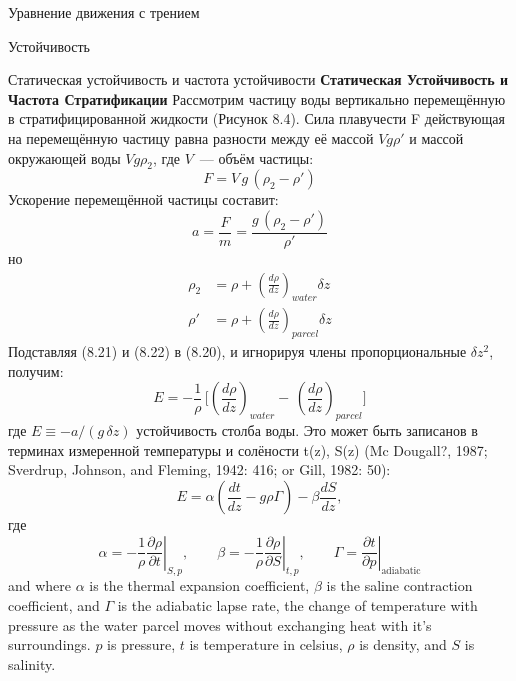 \begin{chapter}{Уравнение движения с трением}
\begin{section}{Устойчивость}
\begin{paragraph}{Статическая устойчивость и частота устойчивости}
\textbf{Статическая Устойчивость и Частота Стратификации}
Рассмотрим частицу воды вертикально перемещённую в стратифицированной
жидкости (Рисунок 8.4). Сила плавучести F действующая на перемещённую
частицу равна разности между её массой $V g \rho '$ и массой окружающей воды
$V g \rho_2$, где $V$~--- объём частицы:
\begin{displaymath}
F=V\,g\,(\rho_2-\rho{'})
\end{displaymath}
Ускорение перемещённой частицы составит:
\begin{equation}
a=\frac{F}{m}=\frac{g\,(\rho_2-\rho{'})}{\rho{'}}
\end{equation}
но
\begin{align}
\rho_2  &= \rho + \left( \frac{d {\rho}}{d {z}}\right)_{water}
\delta z \\
\rho{'} &= \rho + \left( \frac{d {\rho}}{d {z}}\right)_{parcel}
\delta z
\end{align}
Подставляя (8.21) и (8.22) в (8.20), и игнорируя члены
пропорциональные $\delta{z^2}$, получим:
\begin{equation}
E = -\frac{1}{\rho}\,\Biggl[\left(\frac{d \rho}{d {z}}\right)_{water}
- \,\left(\frac{d \rho}{d {z}}\right)_{parcel}\Biggr]
\end{equation}
где $E \equiv -a/(g \, \delta z)$ устойчивость столба воды. Это может
быть записанов в терминах измеренной температуры и солёности t(z),
S(z) (Mc Dougall?, 1987; Sverdrup, Johnson, and Fleming, 1942: 416; or
Gill, 1982: 50):
\begin{equation}
E = \alpha\left(\frac{dt}{dz} - g\rho\Gamma\right) - \beta\frac{dS}{dz},
\end{equation}
где
\begin{equation}
\alpha = -\frac{1}{\rho}\left.\frac{\partial \rho}{\partial t}\right|_{S,p},\qquad
\beta  = -\frac{1}{\rho}\left.\frac{\partial \rho}{\partial S}\right|_{t,p},\qquad
\Gamma = \left. \frac{\partial t}{\partial p}\right|_{\text{adiabatic}}
\end{equation}
and where $\alpha$ is the thermal expansion coefficient, $\beta$ is
the saline contraction coefficient, and $\Gamma$ is the adiabatic
lapse rate, the change of temperature with pressure as the water
parcel moves without exchanging heat with it's surroundings. $p$ is
pressure, $t$ is temperature in celsius, $\rho$ is density, and $S$ is
salinity.
%

\end{paragraph}
\end{section}
\end{chapter}
